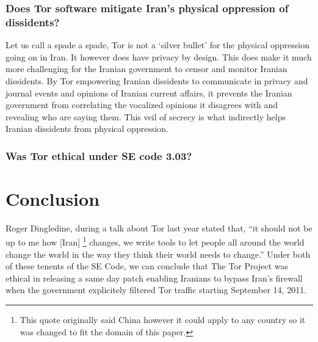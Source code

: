 \documentclass[11pt]{article}
\begin{document}
\begin{multicols}{2}

\subsubsection{Does Tor software mitigate Iran's physical oppression of
dissidents?}

Let us call a spade a spade, Tor is not a `silver bullet' for the physical
oppression going on in Iran. It however does have privacy by design. This does
make it much more challenging for the Iranian government to censor and monitor
Iranian dissidents. By Tor empowering Iranian dissidents to communicate in
privacy and journal events and opinions of Iranian current affairs, it prevents
the Iranian government from correlating the vocalized opinions it disagrees with
and revealing who are saying them. This veil of secrecy is what indirectly helps
Iranian dissidents from physical oppression.


\subsubsection{Was Tor ethical under SE code 3.03?}

\section{Conclusion} 


Roger Dingledine, during a talk about Tor last year stated that, ``it should not
be up to me how [Iran] \footnote{This quote originally said China however it could
  apply to any country so it was changed to fit the domain of this
paper.} changes, we write tools to let people all around the world change the
world in the way they think their world needs to change.'' \cite{Tor:28c3} Under
both of these tenents of the SE Code, we can conclude that The Tor Project was
ethical in releasing a same day patch enabling Iranians to bypass Iran's
firewall when the government explicitely filtered Tor traffic starting September
14, 2011.


\end{multicols} \newpage
\end{document}
